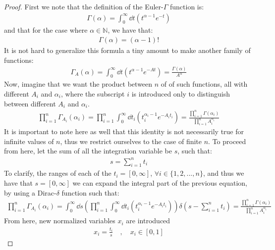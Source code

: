 \documentclass[a4paper,twoside]{article}
\begin{document}
\begin{proof}
First we note that the definition of the Euler-$\Gamma$ function is:
\begin{align*}
\Gamma(\alpha) = \int_{0}^{\infty} \dd{t} \left( t^{\alpha - 1} e^{-t} \right)
\end{align*}
and that for the case where $\alpha \in \mathbb{N}$, we have that:
\begin{align*}
\Gamma(\alpha) = (\alpha - 1)!
\end{align*}
It is not hard to generalize this formula a tiny amount to make another family of functions:
\begin{align*}
\Gamma_{A}(\alpha) = \int_{0}^{\infty} \dd{t} \left( t^{\alpha - 1} e^{-At} \right) = \frac{\Gamma(\alpha)}{A^{\alpha}}
\end{align*}
Now, imagine that we want the product between $n$ of of such functions, all with different $A_{i}$ and $\alpha_{i}$, where the subscript $i$ is introduced only to distinguish between different $A_{i}$ and $\alpha_{i}$.
\begin{align*}
\prod_{i=1}^{n}\Gamma_{A_{i}}(\alpha_{i}) = \prod_{i=1}^{n} \int_{0}^{\infty} \dd{t_{i}} \left( t_{i}^{\alpha_{i} - 1} e^{-A_{i}t_{i}} \right) = \frac{\prod_{i=1}^{n}\Gamma(\alpha_{i})}{\prod_{i=1}^{n}A_{i}^{\alpha_{i}}}
\end{align*}
It is important to note here as well that this identity is not necessarily true for infinite values of $n$, thus we restrict ourselves to the case of finite $n$.
To proceed from here, let the sum of all the integration variable be $s$, such that:
\begin{align*}
s = \sum_{i=1}^{n}t_{i}
\end{align*}
To clarify, the ranges of each of the $t_{i} = [0, \infty]$, $\forall i \in \{1, 2, ... , n\}$, and thus we have that $s = [0, \infty]$
we can expand the integral part of the previous equation, by using a Dirac-$\delta$ function such that:
\begin{align*}
\prod_{i=1}^{n}\Gamma_{A_{i}}(\alpha_{i}) 
= \int_{0}^{\infty} \dd{s} \left( \prod_{i=1}^{n} \int_{0}^{\infty} \dd{t_{i}} \left( t_{i}^{\alpha_{i} - 1} e^{-A_{i}t_{i}} \right) \right) \delta \left(s - \sum_{i=1}^{n}t_{i}\right) 
= \frac{\prod_{i=1}^{n}\Gamma(\alpha_{i})}{\prod_{i=1}^{n}A_{i}^{\alpha_{i}}}
\end{align*}
From here, new normalized variables $x_{i}$ are introduced
\begin{align*}
x_{i} = \frac{t_{i}}{s} \quad , \quad x_{i} \in [0, 1]
\end{align*}

\end{proof}
\end{document}
